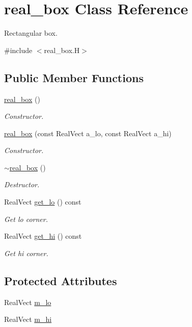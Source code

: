 \hypertarget{classreal__box}{}\section{real\+\_\+box Class Reference}
\label{classreal__box}


Rectangular box.  




{\ttfamily \#include $<$real\+\_\+box.\+H$>$}

\subsection*{Public Member Functions}
\begin{DoxyCompactItemize}
\item 
\hyperlink{classreal__box_a5c22b1ac104adec437aed856d555d65e}{real\+\_\+box} ()
\begin{DoxyCompactList}\small\item\em Constructor. \end{DoxyCompactList}\item 
\hyperlink{classreal__box_a8fc451450df76f0685010c2459b739a7}{real\+\_\+box} (const Real\+Vect a\+\_\+lo, const Real\+Vect a\+\_\+hi)
\begin{DoxyCompactList}\small\item\em Constructor. \end{DoxyCompactList}\item 
\hyperlink{classreal__box_a0c92bb53df13878c3df97d6381770c6b}{$\sim$real\+\_\+box} ()
\begin{DoxyCompactList}\small\item\em Destructor. \end{DoxyCompactList}\item 
Real\+Vect \hyperlink{classreal__box_a094ea039b6dc684fd043fb6ddd85ab5b}{get\+\_\+lo} () const 
\begin{DoxyCompactList}\small\item\em Get lo corner. \end{DoxyCompactList}\item 
Real\+Vect \hyperlink{classreal__box_ad41b609a603592e0e0b2b7da543b3dfe}{get\+\_\+hi} () const 
\begin{DoxyCompactList}\small\item\em Get hi corner. \end{DoxyCompactList}\end{DoxyCompactItemize}
\subsection*{Protected Attributes}
\begin{DoxyCompactItemize}
\item 
Real\+Vect \hyperlink{classreal__box_a4c5a2922df1481943abb6978f37661e1}{m\+\_\+lo}
\item 
Real\+Vect \hyperlink{classreal__box_a8d01d81288f03d4294f37525dec2c9f0}{m\+\_\+hi}
\end{DoxyCompactItemize}


